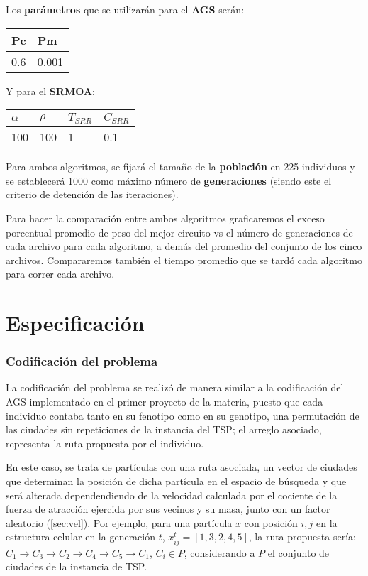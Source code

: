 \documentclass[12pt]{article}
\begin{document}
Los \textbf{parámetros} que se utilizarán para el \textbf{AGS} serán:
\begin{center}
\begin{tabularx}{0.25\textwidth}{|X|X|}
  \hline
\textbf{Pc} &  \textbf{Pm} \\ \hline
0.6 & 0.001 \\ \hline
\end{tabularx}
\end{center}

Y para el \textbf{SRMOA}:
\begin{center}
\begin{tabularx}{0.30\textwidth}{|X|X|X|X|}
  \hline
\textbf{$\alpha$} &  \textbf{$\rho$} & \textbf{$T_{SRR}$} & \textbf{$C_{SRR}$}\\ \hline
100 & 100 & 1 & 0.1 \\ \hline
\end{tabularx}
\end{center}

Para ambos algoritmos, se fijará el tamaño de la \textbf{población} en 225 individuos y se establecerá 1000 como máximo número de \textbf{generaciones} (siendo este el criterio de detención de las iteraciones).

Para hacer la comparación entre ambos algoritmos graficaremos el exceso porcentual promedio de peso del mejor circuito vs el número de generaciones de cada archivo para cada algoritmo, a demás del promedio del conjunto de los cinco archivos. Compararemos también el tiempo promedio que se tardó cada algoritmo para correr cada archivo.

\newpage

\section{Especificación}
\subsubsection*{Codificación del problema}
La codificación del problema se realizó de manera similar a la codificación del AGS implementado en el primer proyecto de la materia, puesto que
cada individuo contaba tanto en su fenotipo como en su genotipo, una permutación de las ciudades sin repeticiones de la instancia del TSP; el arreglo asociado, representa la ruta propuesta por el individuo.

En este caso, se trata de partículas con una ruta asociada, un vector de ciudades que determinan la posición de dicha partícula en el espacio de
búsqueda y que será alterada dependendiendo de la velocidad calculada por el cociente de la fuerza de atracción ejercida por sus vecinos y su masa,
junto con un factor aleatorio (\ref{sec:vel}).
Por ejemplo, para una partícula $x$ con posición $i,j$ en la estructura celular en la generación $t$,
$x_{ij}^t = [1,3,2,4,5]$, la ruta propuesta sería: $C_1 \to C_3 \to C_2 \to C_4 \to C_5 \to C_1$, $C_i \in P$, considerando a $P$ el conjunto de ciudades de la instancia de TSP.
\end{document}
